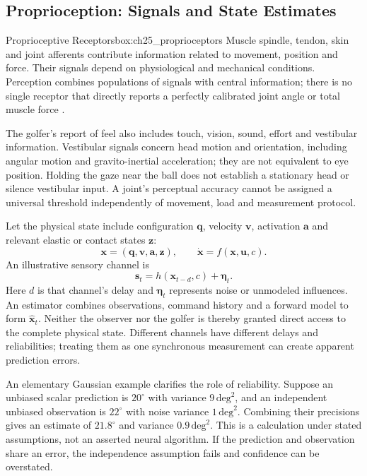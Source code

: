 \subsection{Proprioception: Signals and State Estimates}
\label{subsec:ch25_proprioception}

\begin{principle}{Proprioceptive Receptors}{box:ch25_proprioceptors}
Muscle spindle, tendon, skin and joint afferents contribute information related to movement, position and force. Their signals depend on physiological and mechanical conditions. Perception combines populations of signals with central information; there is no single receptor that directly reports a perfectly calibrated joint angle or total muscle force \citep{proske2012proprioceptive}.
\end{principle}

The golfer's report of feel also includes touch, vision, sound, effort and vestibular information. Vestibular signals concern head motion and orientation, including angular motion and gravito-inertial acceleration; they are not equivalent to eye position. Holding the gaze near the ball does not establish a stationary head or silence vestibular input. A joint's perceptual accuracy cannot be assigned a universal threshold independently of movement, load and measurement protocol.

Let the physical state include configuration $\bm{q}$, velocity $\bm{v}$, activation $\bm{a}$ and relevant elastic or contact states $\bm{z}$:
\[
\bm{x}=(\bm{q},\bm{v},\bm{a},\bm{z}),\qquad
\dot{\bm{x}}=f(\bm{x},\bm{u},c).
\]
An illustrative sensory channel is
\[
\bm{s}_t=h(\bm{x}_{t-d},c)+\bm{\eta}_t.
\]
Here $d$ is that channel's delay and $\bm{\eta}_t$ represents noise or unmodeled influences. An estimator combines observations, command history and a forward model to form $\hat{\bm{x}}_t$. Neither the observer nor the golfer is thereby granted direct access to the complete physical state. Different channels have different delays and reliabilities; treating them as one synchronous measurement can create apparent prediction errors.

An elementary Gaussian example clarifies the role of reliability. Suppose an unbiased scalar prediction is $20^\circ$ with variance $9\,\mathrm{deg}^2$, and an independent unbiased observation is $22^\circ$ with noise variance $1\,\mathrm{deg}^2$. Combining their precisions gives an estimate of $21.8^\circ$ and variance $0.9\,\mathrm{deg}^2$. This is a calculation under stated assumptions, not an asserted neural algorithm. If the prediction and observation share an error, the independence assumption fails and confidence can be overstated.

